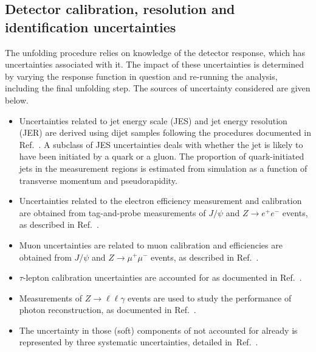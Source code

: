 \documentclass[atlasdraft=false, cernpreprint, UKenglish, texmf, orcidlogo]{atlasdoc}
\begin{document}
\subsection{Detector calibration, resolution and identification uncertainties}
\label{sec:uncertainties}
 
The unfolding procedure relies on knowledge of the detector response, which has uncertainties associated with it.
The impact of these uncertainties is determined by varying the response function in question and re-running the analysis, including
the final unfolding step. The sources of uncertainty considered are given below.
 
\begin{itemize}
 
\item Uncertainties related to jet energy scale (JES) and jet energy resolution
(JER) are derived using dijet samples following the
procedures documented in Ref.~\cite{JETM-2018-05}.
A subclass of JES uncertainties deals with whether the jet is likely to have
been initiated by a quark or a gluon.
The proportion of quark-initiated jets in the measurement regions is
estimated from simulation as a function of transverse momentum and pseudorapidity.
 
\item Uncertainties related to the electron efficiency measurement and
calibration are obtained from tag-and-probe measurements of
$J/\psi$ and $Z\rightarrow e^+e^-$ events, as described in Ref.~\cite{EGAM-2018-01}.
 
\item Muon uncertainties are related to muon calibration and efficiencies are
obtained from $J/\psi$ and $Z\rightarrow \mu^+\mu^-$ events,
as described in Ref.~\cite{MUON-2018-03}.
 
\item $\tau$-lepton calibration uncertainties are accounted for as documented
in Ref.~\cite{ATLAS-CONF-2017-029}.
 
\item Measurements of $Z\rightarrow \ell \ell \gamma$ events are used to study
the performance of photon reconstruction, as documented in Ref.~\cite{EGAM-2018-01}.
 
\item The uncertainty in those (soft) components of \ptmiss not accounted for
already is represented by three systematic uncertainties, detailed
in~Ref.~\cite{PERF-2016-07}.
 
\end{itemize}
 
\end{document}
